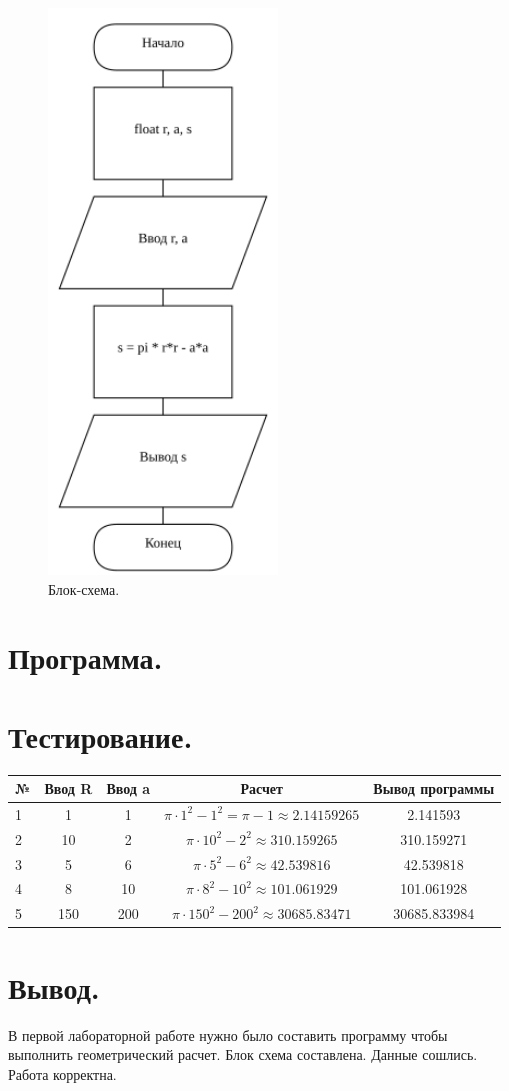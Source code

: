 \documentclass[
    oneside, %
    12pt %
]{extarticle}
\begin{document}
\begin{figure}[h] %
    \centering %
    \includegraphics[height=15cm]{scheme} 
    \caption{Блок-схема.} %
    \label{fig:scheme} %
\end{figure}


\section{Программа.}


\section{Тестирование.}

\begin{tabular}{|l|cc|c|c|}
    \hline
    № & Ввод R & Ввод a & Расчет & Вывод программы \\
    \hline
    1 & 1   & 1   &$ \pi \cdot 1^2 - 1^2 = \pi - 1 \approx 2.14159265 $& 2.141593     \\
    2 & 10  & 2   &$ \pi \cdot 10^2 - 2^2 \approx 310.159265          $& 310.159271  \\
    3 & 5   & 6   &$ \pi \cdot 5^2 - 6^2 \approx 42.539816            $& 42.539818   \\
    4 & 8   & 10  &$ \pi \cdot 8^2 - 10^2 \approx 101.061929          $& 101.061928  \\
    5 & 150 & 200 &$ \pi \cdot 150^2 - 200^2 \approx 30685.83471      $& 30685.833984\\
    \hline
\end{tabular}

\section{Вывод.}

В первой лабораторной работе нужно было составить программу чтобы выполнить геометрический расчет. 
Блок схема составлена. Данные сошлись. Работа корректна.
\end{document}
